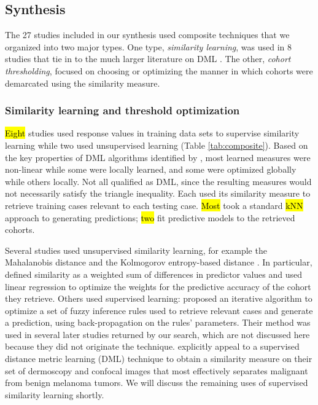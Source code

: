 \documentclass[sn-mathphys,Numbered,pdflatex]{sn-jnl}
\theoremstyle{remark}
\theoremstyle{definition}
\begin{document}
\subsection{Synthesis}\label{synthesis-1}

The 27 studies included in our synthesis used composite techniques that
we organized into two major types. One type, \emph{similarity learning},
was used in 8 studies that tie in to the much larger literature on DML
\citep{Yang2006}. The other, \emph{cohort thresholding}, focused on
choosing or optimizing the manner in which cohorts were demarcated using
the similarity measure.

\subsubsection{Similarity learning and threshold
optimization}\label{similarity-learning-and-threshold-optimization}

\hl{Eight} studies used response values in training data sets to
supervise similarity learning while two used unsupervised learning
(Table \ref{tab:composite}). Based on the key properties of DML
algorithms identified by \citet{Bellet2014}, most learned measures were
non-linear while some were locally learned, and some were optimized
globally while others locally. Not all qualified as DML, since the
resulting measures would not necessarily satisfy the triangle
inequality. Each used its similarity measure to retrieve training cases
relevant to each testing case. \hl{Most} took a standard \hl{kNN} approach to
generating predictions; \hl{two} \citep{Vilhena2016, Tang2021} fit
predictive models to the retrieved cohorts.

Several studies used unsupervised similarity learning, for example the
Mahalanobis distance \citep{Lowsky2013} and the Kolmogorov entropy-based
distance \citep{Elter2007}. In particular, \citet{Yearwood1997} defined
similarity as a weighted sum of differences in predictor values and used
linear regression to optimize the weights for the predictive accuracy of
the cohort they retrieve. Others used supervised learning:
\citet{Song2006} proposed an iterative algorithm to optimize a set of
fuzzy inference rules used to retrieve relevant cases and generate a
prediction, using back-propagation on the rules' parameters. Their
method was used in several later studies returned by our search, which
are not discussed here because they did not originate the technique.
\citet{Nicolas2014} explicitly appeal to a supervised distance metric
learning (DML) technique \citep{Xing2002} to obtain a similarity measure
on their set of dermoscopy and confocal images that most effectively
separates malignant from benign melanoma tumors. We will discuss the
remaining uses of supervised similarity learning shortly.
\end{document}
